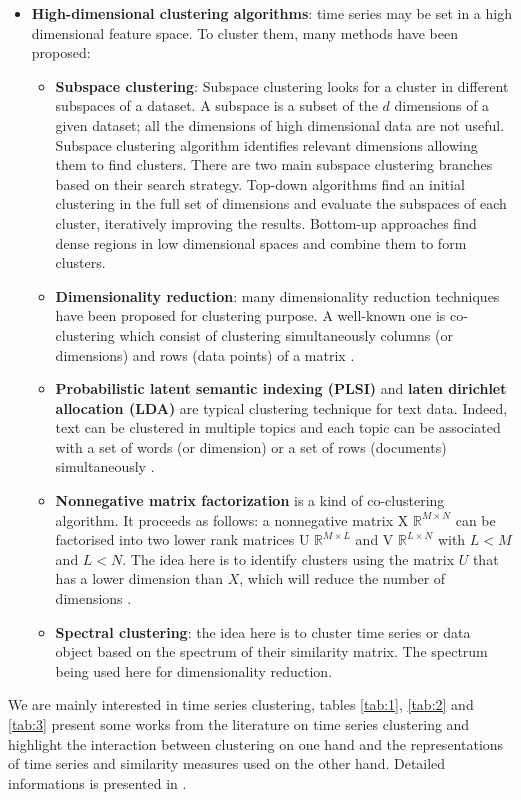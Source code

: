 \begin{itemize}
\item  \textbf{High-dimensional clustering algorithms}: time series may be set in a high dimensional feature space. To cluster them, many methods have been proposed:

\begin{itemize}
	\item  \textbf{Subspace clustering}: Subspace clustering looks for a cluster in 	different subspaces of a dataset.  A subspace is a subset of the $d$ dimensions 		of a given dataset; all the dimensions of high dimensional data are not useful. 	Subspace clustering algorithm identifies relevant dimensions allowing them to 		find clusters. There are two main subspace clustering branches based on their 		search strategy. Top-down algorithms find an initial clustering in the full set 		of dimensions and evaluate the subspaces of each cluster, iteratively improving 	the results. Bottom-up approaches find dense regions in low dimensional spaces 		and combine them to form clusters\cite{parsons2004subspace}.
	\item \textbf{Dimensionality reduction}: many dimensionality reduction 				techniques have been proposed for clustering purpose. A well-known one is co-clustering which consist of clustering simultaneously columns (or dimensions) 	and	rows (data points) of a matrix \cite{dhillon2003information}.
	\item \textbf{Probabilistic latent semantic indexing (PLSI)} and \textbf{laten 		dirichlet allocation (LDA)}  are typical clustering technique for text data. Indeed, text can be clustered in multiple topics and  each topic can be associated with a 		set of words (or dimension) or a set of rows (documents) simultaneously 			\cite{hofmann2017probabilistic}.
	\item \textbf{Nonnegative matrix factorization} is a kind of co-clustering 			algorithm. It proceeds as follows: a nonnegative matrix X \in $\mathbb{R}^{M			\times N}$ can be 			factorised into two lower rank matrices U \in $			\mathbb{R}^{M\times L}$ and V \in $\mathbb{R}^{L\times N}$ with $L < M$ and $L 		< N$.  The idea here is to identify clusters using the matrix $U$ that has a lower 	dimension than $X$, which will reduce the number of dimensions 						\cite{wang2013nonnegative}.
	\item \textbf{Spectral clustering}: the idea here is to cluster time series or 		data object based on the spectrum of their similarity matrix. The spectrum 			being used here for dimensionality reduction\cite{filippone2008survey}.
	
\end{itemize}
 

\end{itemize}
We are mainly interested in time series clustering, tables \ref{tab:1}, \ref{tab:2} and \ref{tab:3} present some works from the literature on time series clustering and highlight the interaction between clustering on  one hand and the representations of time series and similarity measures used on the other hand. Detailed informations is presented in \cite{rani2012recent}. 

